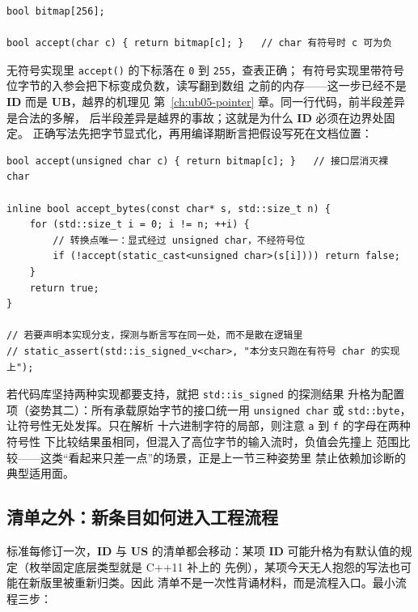\documentclass[12pt,a4paper,fontset=fandol]{ctexbook}
\newcommand{\cpp}[1]{C++#1}
\newcommand{\Fn}[1]{\texttt{#1()}}
\newcommand{\Tp}[1]{\texttt{#1}}
\newcommand{\UB}{\textbf{\textsf{UB}}}
\newcommand{\IDB}{\textbf{\textsf{ID}}}
\newcommand{\USB}{\textbf{\textsf{US}}}
\begin{document}
\begin{lstlisting}[style=cppstyle, caption={问题写法：拿裸 char 当 256 项表的下标}]
bool bitmap[256];

bool accept(char c) { return bitmap[c]; }   // char 有符号时 c 可为负
\end{lstlisting}

\begin{casebox}[title=char 符号性：同一输入在两份实现上的两种结局]
无符号实现里 \Fn{accept} 的下标落在 \Tp{0} 到 \Tp{255}，查表正确；
有符号实现里带符号位字节的入参会把下标变成负数，读写翻到数组
之前的内存——这一步已经不是 \IDB{} 而是 \UB{}，越界的机理见
第~\ref{ch:ub05-pointer} 章。同一行代码，前半段差异是合法的多解，
后半段差异是越界的事故；这就是为什么 \IDB{} 必须在边界处固定。
正确写法先把字节显式化，再用编译期断言把假设写死在文档位置：
\end{casebox}

\begin{lstlisting}[style=cppstyle, caption={修正写法：入口即转 unsigned char，假设另有断言兜底}]
bool accept(unsigned char c) { return bitmap[c]; }   // 接口层消灭裸 char

inline bool accept_bytes(const char* s, std::size_t n) {
    for (std::size_t i = 0; i != n; ++i) {
        // 转换点唯一：显式经过 unsigned char，不经符号位
        if (!accept(static_cast<unsigned char>(s[i]))) return false;
    }
    return true;
}

// 若要声明本实现分支，探测与断言写在同一处，而不是散在逻辑里
// static_assert(std::is_signed_v<char>, "本分支只跑在有符号 char 的实现上");
\end{lstlisting}

若代码库坚持两种实现都要支持，就把 \Tp{std::is\_signed} 的探测结果
升格为配置项（姿势其二）：所有承载原始字节的接口统一用
\Tp{unsigned char} 或 \Tp{std::byte}，让符号性无处发挥。只在解析
十六进制字符的局部，则注意 \Tp{a} 到 \Tp{f} 的字母在两种符号性
下比较结果虽相同，但混入了高位字节的输入流时，负值会先撞上
范围比较——这类“看起来只差一点”的场景，正是上一节三种姿势里
禁止依赖加诊断的典型适用面。

\subsection{清单之外：新条目如何进入工程流程}\label{sec:ub13-workflow}

标准每修订一次，\IDB{} 与 \USB{} 的清单都会移动：某项 \IDB{}
可能升格为有默认值的规定（枚举固定底层类型就是 \cpp{11} 补上的
先例），某项今天无人抱怨的写法也可能在新版里被重新归类。因此
清单不是一次性背诵材料，而是流程入口。最小流程三步：
\end{document}
